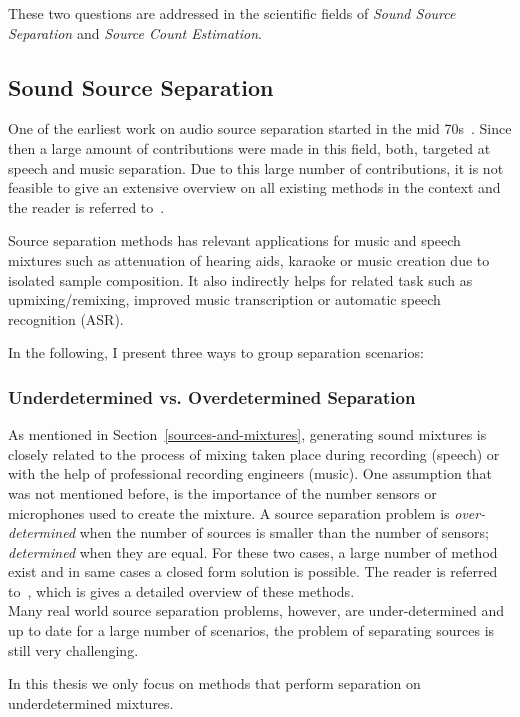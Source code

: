 These two questions are addressed in the scientific fields of \emph{Sound Source Separation} and \emph{Source Count Estimation}.

\subsection{Sound Source Separation}

One of the earliest work on audio source separation started in the mid 70s~\cite{miller73}.
Since then a large amount of contributions were made in this field, both, targeted at speech and music separation.
Due to this large number of contributions, it is not feasible to give an extensive overview on all existing methods in the context and the reader is referred to~\cite{vincent18, comon10, rafii}.
\par
Source separation methods has relevant applications for music and speech mixtures such as attenuation of hearing aids, karaoke or music creation due to isolated sample composition.
It also indirectly helps for related task such as upmixing/remixing, improved music transcription or automatic speech recognition (ASR). 
\par
In the following, I present three ways to group separation scenarios:

\subsubsection*{Underdetermined vs. Overdetermined Separation}
As mentioned in Section~\ref{sources-and-mixtures}, generating sound mixtures is closely related to the process of mixing taken place during recording (speech) or with the help of professional recording engineers (music).
One assumption that was not mentioned before, is the importance of the number sensors or microphones used to create the mixture.
A source separation problem is \emph{over-determined} when the number of sources is smaller than the number of sensors; \emph{determined} when they are equal.
For these two cases, a large number of method exist and in same cases a closed form solution is possible.
The reader is referred to~\cite{common10}, which is gives a detailed overview of these methods.\\
Many real world source separation problems, however, are under-determined and up to date for a large number of scenarios, the problem of separating sources is still very challenging.
\par
In this thesis we only focus on methods that perform separation on underdetermined mixtures.

